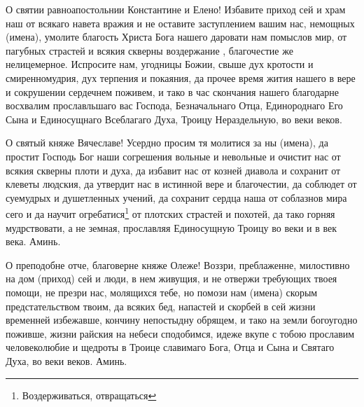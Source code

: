 \mychapterending


\begin{mymulticols}



О святии равноапостольнии Константине и Елено! Избавите приход сей и храм наш от всякаго навета вражия и не оставите заступлением вашим нас, немощных (имена), умолите благость Христа Бога нашего даровати нам помыслов мир, от пагубных страстей и всякия скверны воздержание , благочестие же нелицемерное.  Испросите нам, угодницы Божии, свыше дух кротости и смиренномудрия, дух терпения и покаяния,  да прочее время жития нашего в вере и сокрушении сердечнем поживем, и тако в час скончания нашего благодарне восхвалим прославльшаго вас Господа, Безначальнаго Отца, Единороднаго Его Сына и Единосущнаго Всеблагаго Духа, Троицу Нераздельную, во веки веков.

\end{mymulticols}

\mychapterending


\begin{mymulticols}



О святый княже Вячеславе! Усердно просим тя молитися за ны (имена), да простит Господь Бог наши согрешения вольные и невольные и очистит нас от всякия скверны плоти и духа, да избавит нас от козней диавола и сохранит от клеветы людския, да утвердит нас в истинной вере и благочестии, да соблюдет от суемудрых и душетленных учений, да сохранит сердца наша от соблазнов мира сего и да научит огребатися\footnote{Воздерживаться, отвращаться} от плотских страстей и похотей, да тако горняя мудрствовати, а не земная, прославляя Единосущную Троицу во веки и в век века. Аминь.

\end{mymulticols}

\mychapterending


\begin{mymulticols}



О преподобне отче, благоверне княже Олеже! Воззри, преблаженне, милостивно на дом (приход) сей и люди, в нем живущия, и не отвержи требующих твоея помощи, не презри нас, молящихся тебе, но помози нам (имена) скорым предстательством твоим, да всяких бед, напастей и скорбей в сей жизни временней избежавше, кончину непостыдну обрящем, и тако на земли богоугодно поживше, жизни райския на небеси сподобимся, идеже вкупе с тобою прославим человеколюбие и щедроты в Троице славимаго Бога, Отца и Сына и Святаго Духа, во веки веков. Аминь.

\end{mymulticols}

